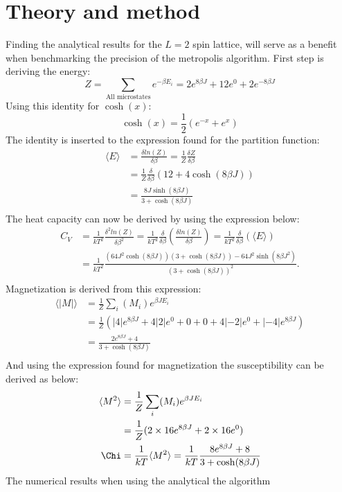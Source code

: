 \documentclass{emulateapj}
\begin{document}
\section{Theory and method}
\label{sec:method}
Finding the analytical results for the $L=2$ spin lattice, will serve as a benefit when benchmarking the precision of the metropolis algorithm. First step is deriving the energy:
%
\begin{equation*}
    Z = \sum_{ \text{All microstates}} e^{-\beta E_{i}} = 2e^{8\beta J} + 12e^{0} + 2e^{-8\beta J}
\end{equation*}
%
Using this identity for $\cosh(x)$:
%
\begin{equation*}
    \cosh(x) = \frac{1}{2} (e^{-x} + e^{x})
\end{equation*}
%
The identity is inserted to the expression found for the partition function:
%
\begin{align*}
    \langle E \rangle &= \frac{\delta ln(Z)}{\delta \beta} = \frac{1}{Z}\frac{\delta Z}{\delta \beta}\\
    &= \frac{1}{Z}\frac{\delta }{\delta \beta} (12 + 4 \cosh(8\beta J))\\
    &= \frac{8 J \sinh({8 \beta J})}{3 +  \cosh({8\beta J})}\\
\end{align*}
%
The heat capacity can now be derived by using the expression below:
%
\begin{align*}
    C_{V} &= \frac{1}{kT^2} \frac{\delta^2 ln(Z)}{\delta \beta^2} = \frac{1}{kT^2} \frac{\delta}{\delta \beta}(\frac{\delta ln(Z)}{\delta \beta})
    = \frac{1}{kT^2} \frac{\delta}{\delta \beta}(\langle E \rangle)\\
    &= \frac{1}{kT^2}\frac{(64 J^2 \cosh({8 \beta J}))(3 + \cosh (8 \beta J)) - 64 J^2 \sinh({8 \beta J}^2)}{(3 + \cosh (8 \beta J))^2}.\\
\end{align*}
%
Magnetization is derived from this expression:
%
\begin{align*}
    \langle |M| \rangle &= \frac{1}{Z} \sum_{i} (M_{i})e^{\beta J E_{i}} \\
    &= \frac{1}{Z}(|4|e^{8\beta J} + 4|2|e^{0} + 0 + 0 + 4|-2|e^{0} + |-4|e^{8\beta J}) \\
    &= \frac{2e^{8\beta J}+4}{3 + \cosh(8\beta J)} \\
\end{align*}
%
And using the expression found for magnetization the susceptibility can be derived as below:
%
\begin{align*}
    \langle M^2 \rangle &= \frac{1}{Z} \sum_{i} (M_{i})e^{\beta J E_{i}} \\
    &= \frac{1}{Z} (2 \times 16e^{8\beta J} + 2 \times 16e^{0}) \\
    \Chi &= \frac{1}{kT}\langle M^2 \rangle = \frac {1}{kT} \frac{8e^{8\beta J} + 8}{3+\cosh(8\beta J)}\\
\end{align*}
%
The numerical results when using the analytical the algorithm
%
\end{document}
